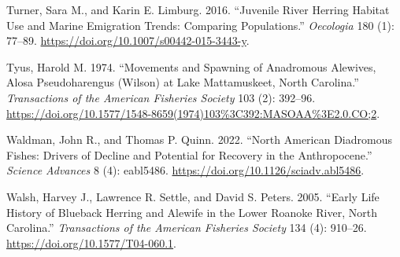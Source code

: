\documentclass[
]{book}
\newlength{\cslhangindent}
\newlength{\cslentryspacingunit} %
\newenvironment{CSLReferences}[2] %
 {%
  \setlength{\parindent}{0pt}
  \ifodd #1
  \let\oldpar\par
  \def\par{\hangindent=\cslhangindent\oldpar}
  \fi
  \setlength{\parskip}{#2\cslentryspacingunit}
 }%
 {}
\begin{document}
\begin{CSLReferences}{1}{0}
\leavevmode{}%
Turner, Sara M., and Karin E. Limburg. 2016. {``Juvenile River Herring Habitat Use and Marine Emigration Trends: Comparing Populations.''} \emph{Oecologia} 180 (1): 77--89. \url{https://doi.org/10.1007/s00442-015-3443-y}.

\leavevmode{}%
Tyus, Harold M. 1974. {``Movements and {Spawning} of {Anadromous} {Alewives}, {Alosa} Pseudoharengus ({Wilson}) at {Lake} {Mattamuskeet}, {North} {Carolina}.''} \emph{Transactions of the American Fisheries Society} 103 (2): 392--96. \url{https://doi.org/10.1577/1548-8659(1974)103\%3C392:MASOAA\%3E2.0.CO;2}.

\leavevmode{}%
Waldman, John R., and Thomas P. Quinn. 2022. {``North {American} Diadromous Fishes: {Drivers} of Decline and Potential for Recovery in the {Anthropocene}.''} \emph{Science Advances} 8 (4): eabl5486. \url{https://doi.org/10.1126/sciadv.abl5486}.

\leavevmode{}%
Walsh, Harvey J., Lawrence R. Settle, and David S. Peters. 2005. {``Early {Life} {History} of {Blueback} {Herring} and {Alewife} in the {Lower} {Roanoke} {River}, {North} {Carolina}.''} \emph{Transactions of the American Fisheries Society} 134 (4): 910--26. \url{https://doi.org/10.1577/T04-060.1}.

\end{CSLReferences}
\end{document}
